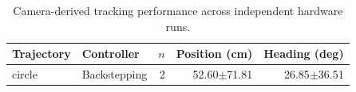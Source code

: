 \begin{table}[!t]
\centering
\caption{Camera-derived tracking performance across independent hardware runs.}
\label{tab:tracking}
\begin{tabular}{llrrr}
\hline
Trajectory & Controller & $n$ & Position (cm) & Heading (deg) \\
\hline
circle & Backstepping & 2 & 52.60$\pm$71.81 & 26.85$\pm$36.51 \\
\hline
\end{tabular}
\end{table}
